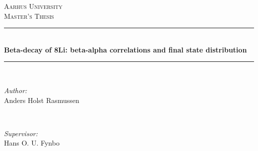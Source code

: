 \documentclass[12pt]{article}
\begin{document}
\begin{titlepage}

\newcommand{\HRule}{\rule{\linewidth}{0.5mm}} %

\center %
 

\textsc{\LARGE Aarhus University}\\[1.5cm] %
\textsc{\Large Master's Thesis}\\[0.5cm] %



\HRule \\[0.4cm]
{ \Large \bfseries Beta-decay of 8Li: beta-alpha correlations and final state distribution}\\[0.4cm] %
\HRule \\[1.5cm]
 

\begin{minipage}{0.4\textwidth}
\begin{flushleft} \large
\emph{Author:}\\
Anders Holst Rasmussen
\end{flushleft}
\end{minipage}
~
\begin{minipage}{0.4\textwidth}
\begin{flushright} \large
\emph{Supervisor:} \\
Hans O. U. Fynbo %
\end{flushright}
\end{minipage}\\[2cm]



\end{titlepage}
\end{document}
